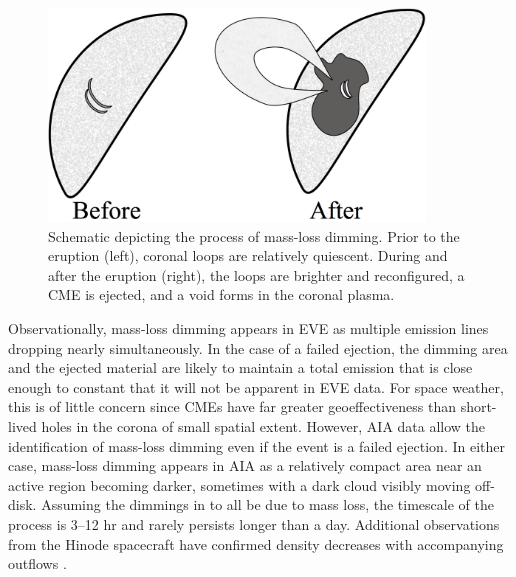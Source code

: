 \begin{figure}[!b]
	\caption[Schematic of mass-loss dimming]{
	    Schematic depicting the process of mass-loss dimming. Prior to the eruption (left), coronal loops are relatively 
	    quiescent. During and after the eruption (right), the loops are brighter and reconfigured, a CME is ejected, and a 
	    void forms in the coronal plasma.
	}
    \begin{center}
	    \includegraphics[width=100mm]{Images/MassLossDimming.png}
    \end{center}
    \label{massLossDimming}
\end{figure}

Observationally, mass-loss dimming appears in EVE as multiple emission lines dropping nearly simultaneously. In the case of a failed ejection, the dimming area and the ejected material are likely to maintain a total emission that is close enough to constant that it will not be apparent in EVE data. For space weather, this is of little concern since CMEs have far greater geoeffectiveness than short-lived holes in the corona of small spatial extent. However, AIA data allow the identification of mass-loss dimming even if the event is a failed ejection. In either case, mass-loss dimming appears in AIA as a relatively compact area near an active region becoming darker, sometimes with a dark cloud visibly moving off-disk. Assuming the dimmings in \citet{Reinard2008} to all be due to mass loss, the timescale of the process is 3–12 hr and rarely persists longer than a day. Additional observations from the Hinode spacecraft have confirmed density decreases with accompanying outflows \citep{Attrill2010, Harra2010, Tian2012}.

